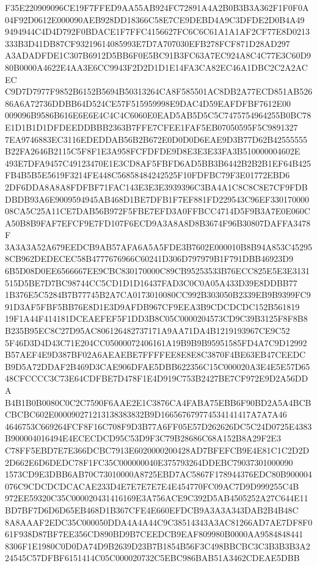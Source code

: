 \documentclass[UTF8,fontset=fandol,zihao=-4,a4paper]{ctexart}
\begin{document}
{{F35E220909096CE19F7FFED9AA55AB924FC72891A4A2B0B3B3A362F1F0F0A04F92D0612E000090AEB928DD18366C58E7CE9DEBD4A9C3DFDE2D0B4A49
9494944C4D4D792F0BDACE1F7FFC4156627FC6C6C61A1A1AF2CF77E8D0213333B3D41DB87CF93219614085993E7D7A707030EFB278FCF871D28AD297
A3ADADFDE1C307B6912D5BB6F0E5BC91B3FC63A7EC924A8C4C77E3C60D980B0000A4622E4AA3E6CC9943F2D2D1D1E14FA3CA82EC46A1DBC2C2A2ACEC
C9D7D7977F9852B6152B5694B50313264CA8F585501AC8DB2A77ECD851AB52686A6A72736DDBB64D524CE57F515959998E9DAC4D59EAFDFBF7612E00
009096B9586B616E6E6E4C4C4C6060E0EAD5AB5D5C5C7475754964255B0BC78E1D1B1D1DFDEEDDBBB2363B7FFE7CFEE1FAF5EB07050595F5C9891327
7EA9746883EC3116EDEDDAB56B2B672E0D0D0D6EAE9D3B77D62B42555555B22FA2646B2115C5F8F1E3A958FCFDFDE9D8E3E3E33FA3B510000004602E
493E7DFA9457C49123470E1E3CD8AF5FBFD6AD5BB3B6442B2B2B1EF64B425FB4B5B5E5619F3214FE448C56858484242525F10FDFBC79F3E01772EBD6
2DF6DDA8A8A8FDFBF71FAC143E3E3E3939396C3BA4A1C8C8C8E7CF9FDBDBDB93A6E9009594945AB468D1BE7DFB1F7EF881FD229543C96EF330170000
08CA5C25A11CE7DAB56B972F5FBE7EFD3A0FFBCC4714D5F9B3A7E0E060CA50B8B9FAF7EFCF9E7FD107F6ECD9A3A8A8D8B3674F96B30807DAFFA3478F
3A3A3A52A679EEDCB9AB57AFA6A5A5FDE3B7602E000010B8B94A853C452958CB962DEDECEC58B4777676966C60241D306D797979B1F791DBB46923D9
6B5D08D0EE6566667EE9CBC830170000C89CB95253533B76ECC825E5E3E3131515D5BE7D7BC98744CC5CD1D1D16437FAD3C0C0A05A433D39E8DDBB77
1B376E5C5284B7B77745B2A7CA0173010080CC992B303050B2339EB9B9399FC991D3AF5FBF5BB76E8D1E3D9AFDB967CF9EEA3B9CDCDCDC152B561819
19F1A44F414181DCEAEFEF5F1DD3B8C05C0000204573CD9C39B3125F8F8B8B235B95EC8C27D95AC806126482737171A9AA71DA4B1219193967CE9C52
5F46D3D4D43C71E204CC05000072406161A19B9B9B95951585FD4A7C9D12992B57AEF4E9D387BF02A6AEAEBE7FFFFEE8E8E8C3870F4BE63EB47CEEDC
B9D5A72DDAF2B469D3CAE906DFAE5DBB622356C15C000020A3E4E5E57D6548CFCCCC3C73E64CDFBE7D478F1E4D919C753B2427BE7CF972E9D2A56DDA
B4B1B0B0080C0C2C7590F6AAE2E1C3876CA4FABA75EBB6F90BD2A5A4BCBCBCBC602E000090271213138383832B9D166567679774534141417A7A7A46
4646753C669264FCF8F16C708F9D3B77A6FF05E57D262626DC5C24D0725E4383B900004016494E4ECECDCD95C53D9F3C79B28686C68A152B8A29F2E3
C78FF5EBD7E7E366DCBC7913E6020000200428AD7BFEFCB9E4E81C1C2D2D2D662E6D6DEDC78F1FC35C000000040E375793264DDEBC79037301000090
1573CD9E3DBB6AB70C73010000A8725EBD7AC5867F178944376EDC80B900004076C9CDCDCDCACAE233D4E7E7E7E7E4E454770FC09AC7D9D999255C4B
972EE59320C35C000020431416169E3A756ACE9C392D5AB4505252A27C644E11BD7BF7D6D6D65EB468D1B367CFE4E660EFDCB9A3A3A343DAB2B4B48C
8A8AAAF2EDC35C000050DDA4A4A44C9C38514343A3AC81266AD7AE7DF8F061F938D87BF7EE356CD890BD9B7CEEDCB9EAF809980B0000AA9584848441
8306F1E1980C0D0DA74D9B2639D23B7B1854B56F3C498BBCBC3C3B3B3B3A224545C57DFBF6151414C05C000020732C5EBC986BAB51A3462CDEAE5DBB
}}
\end{document}
